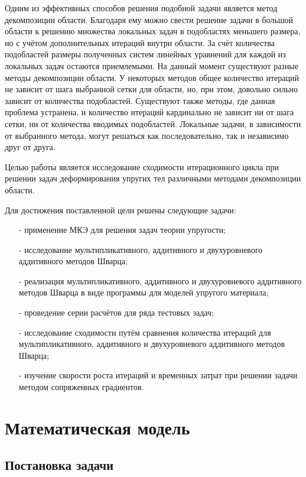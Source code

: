 \documentclass[a4paper, 14pt]{extarticle}
\begin{document}
Одним из эффективных способов решения подобной задачи является метод декомпозиции области. Благодаря ему можно свести решение задачи в большой области к решению множества локальных задач в подобластях меньшего размера, но с учётом дополнительных итераций внутри области. За счёт количества подобластей размеры полученных систем линейных уравнений для каждой из локальных задач остаются приемлемыми. На данный момент существуют разные методы декомпозиции области. У некоторых методов общее количество итераций не зависит от шага выбранной сетки для области, но, при этом, довольно сильно зависит от количества подобластей. Существуют также методы, где данная проблема устранена, и количество итераций кардинально не зависит ни от шага сетки, ни от количества вводимых подобластей. Локальные задачи, в зависимости от выбранного метода, могут решаться как последовательно, так и независимо друг от друга.

Целью работы является исследование сходимости итерационного цикла при решении задач деформирования упругих тел различными методами декомпозиции области.

Для достижения поставленной цели решены следующие задачи:
\begin{itemize}
\item[-]применение МКЭ для решения задач теории упругости;
\item[-]исследование мультипликативного, аддитивного и двухуровневого аддитивного методов Шварца;
\item[-]реализация мультипликативного, аддитивного и двухуровневого аддитивного методов Шварца в виде программы для моделей упругого материала;
\item[-]проведение серии расчётов для ряда тестовых задач;
\item[-]исследование сходимости путём сравнения количества итераций для мультипликативного, аддитивного и двухуровневого аддитивного методов Шварца;
\item[-]изучение скорости роста итераций и временных затрат при решении задачи методом сопряженных градиентов.
\end{itemize}

\newpage
 
\section{Математическая модель}

\subsection{Постановка задачи}
\end{document}
